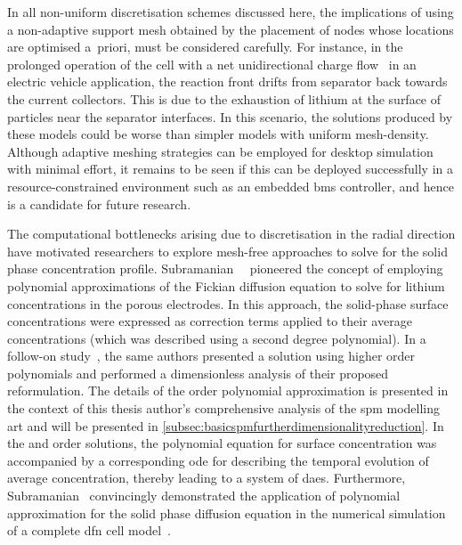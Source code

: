 In all  non-uniform discretisation schemes  discussed here, the  implications of
using  a non-adaptive  support mesh  obtained by  the placement  of nodes  whose
locations are optimised a~priori, must be considered carefully. For instance, in
the prolonged operation of the cell with a net unidirectional charge flow \eg~in
an electric vehicle  application, the reaction front drifts  from separator back
towards the current collectors. This is due  to the exhaustion of lithium at the
surface  of particles  near  the  separator interfaces.  In  this scenario,  the
solutions  produced by  these models  could be  worse than  simpler models  with
uniform mesh-density. Although  adaptive meshing strategies can  be employed for
desktop simulation  with minimal effort,  it remains to be  seen if this  can be
deployed successfully in a resource-constrained  environment such as an embedded
\gls{bms} controller, and hence is  a candidate for future research.


The   computational   bottlenecks  arising   due   to   discretisation  in   the
radial   direction    have   motivated   researchers   to    explore   mesh-free
approaches   to    solve   for   the   solid    phase   concentration   profile.
Subramanian~\etal~\cite{Subramanian2004}  pioneered  the  concept  of  employing
polynomial approximations of the Fickian diffusion equation to solve for lithium
concentrations  in the  porous  electrodes. In  this  approach, the  solid-phase
surface  concentrations were  expressed  as correction  terms  applied to  their
average concentrations (which  was described using a  second degree polynomial).
In  a   follow-on  study~\cite{Subramanian2005},  the  same   authors  presented
a  solution  using  higher  order  polynomials  and  performed  a  dimensionless
analysis of  their proposed reformulation.  The details of  the 
order  polynomial approximation  is  presented  in the  context  of this  thesis
author's  comprehensive  analysis  of  the  \gls{spm}  modelling  art  and  will
be  presented  in \cref{subsec:basicspmfurtherdimensionalityreduction}.  In  the
 and   order solutions, the  polynomial equation
for  surface concentration  was  accompanied by  a  corresponding \gls{ode}  for
describing  the temporal  evolution  of average  concentration, thereby  leading
to  a  system  of  \glspl{dae}.  Furthermore,  Subramanian~\etal{}  convincingly
demonstrated the  application of  polynomial approximation  for the  solid phase
diffusion  equation in  the numerical  simulation of  a complete  \gls{dfn} cell
model~\cite{Subramanian2007}.


